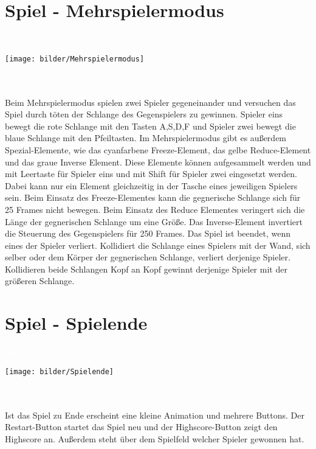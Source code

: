 \section{Spiel - Mehrspielermodus}
\label{Spiel_-_Unterkapitel_3}
%
\textcolor{white}{easily}
\newline 
\begin{minipage}[X]{1.0\textwidth}
 \centering
 \texttt{[image: bilder/Mehrspielermodus]}
 \label{fig:mehrspielermodus}
\end{minipage}
\\ \\ 
	Beim Mehrspielermodus spielen zwei Spieler gegeneinander und versuchen das Spiel durch töten der Schlange des Gegenspielers zu gewinnen. Spieler eins bewegt die rote Schlange mit den Tasten A,S,D,F und Spieler zwei bewegt die blaue Schlange mit den Pfeiltasten. Im Mehrspielermodus gibt es außerdem Spezial-Elemente, wie das cyanfarbene Freeze-Element, das gelbe Reduce-Element und das graue Inverse Element. Diese Elemente können aufgesammelt werden und mit Leertaste für Spieler eins und mit Shift für Spieler zwei eingesetzt werden. Dabei kann nur ein Element gleichzeitig in der Tasche eines jeweiligen Spielers sein. Beim Einsatz des Freeze-Elementes kann die gegnerische Schlange sich für 25 Frames nicht bewegen. Beim Einsatz des Reduce Elementes veringert sich die Länge der gegnerischen Schlange um eine Größe. Das Inverse-Element invertiert die Steuerung des Gegenspielers für 250 Frames. Das Spiel ist beendet, wenn eines der Spieler verliert. Kollidiert die Schlange eines Spielers mit der Wand, sich selber oder dem Körper der gegnerischen Schlange, verliert derjenige Spieler. Kollidieren beide Schlangen Kopf an Kopf gewinnt derjenige Spieler mit der größeren Schlange.  

\section{Spiel - Spielende}
\label{Spiel_-_Unterkapitel_4}
%
\textcolor{white}{easily}
\newline 
\begin{minipage}[X]{1.1\textwidth}
 \centering
 \texttt{[image: bilder/Spielende]}
 \label{fig:spielende}
\end{minipage}
\\ \\ 
	Ist das Spiel zu Ende erscheint eine kleine Animation und mehrere Buttons. Der Restart-Button startet das Spiel neu und der Highscore-Button zeigt den Highscore an. Außerdem steht über dem Spielfeld welcher Spieler gewonnen hat.  

%
